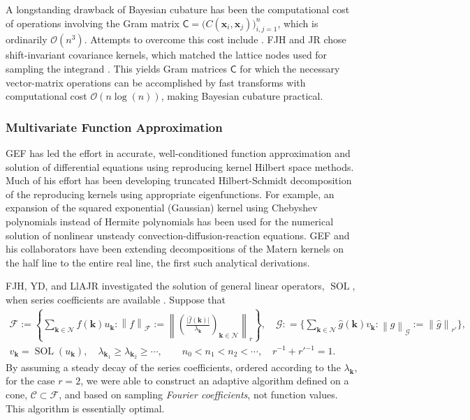 \documentclass[11pt]{NSFamsart}
\newcommand{\hf}{\widehat{f}}
\newcommand{\hg}{\widehat{g}}
\newcommand{\mC}{\mathsf{C}}
\DeclareMathOperator{\SOL}{SOL}
\newcommand{\bx}{{\boldsymbol{x}}}
\newcommand{\bk}{{\boldsymbol{k}}}
\newcommand{\cc}{\mathcal{C}}
\newcommand{\calf}{{\mathcal{F}}}
\newcommand{\calg}{{\mathcal{G}}}
\newcommand{\caln}{{\mathcal{N}}}
\newcommand{\bigabs}[1]{\ensuremath{\bigl \lvert #1 \bigr \rvert}}
\newcommand{\norm}[2][{}]{\ensuremath{\left \lVert #2 \right \rVert}_{#1}}
\newcommand{\bignorm}[2][{}]{\ensuremath{\bigl \lVert #2 \bigr \rVert}_{#1}}
\newcommand{\Order}{\mathcal{O}}
\begin{document}
A longstanding drawback of Bayesian cubature has been the computational cost of operations
involving the Gram matrix $\mC = \bigl(C(\bx_i,\bx_j)\bigr)_{i,j=1}^n$, which is ordinarily
$\Order(n^3)$.  Attempts to overcome this cost include \cite{AniCheSte16a, ParEtal17a}.  FJH and JR chose shift-invariant covariance kernels, which matched the lattice nodes used for sampling the integrand \cite{RatHic19a}. This yields Gram matrices $\mC$ for which the necessary vector-matrix operations can be accomplished by fast transforms with computational cost $\Order(n 
\log(n))$, making Bayesian cubature practical.  %

\subsubsection{Multivariate Function Approximation} \label{sec:PrevFunAppx}

GEF has led the effort in accurate, well-conditioned function approximation and solution of 
differential equations using reproducing kernel Hilbert space methods.  Much of his effort has been 
developing truncated Hilbert-Schmidt decomposition of the reproducing kernels using appropriate 
eigenfunctions.  For example, an expansion of the squared exponential (Gaussian) kernel using 
Chebyshev polynomials instead of Hermite polynomials has been used for the numerical solution of 
nonlinear unsteady 
convection-diffusion-reaction equations.  GEF and his collaborators have been extending 
decompositions of the Matern kernels on the half line to the entire real line, the first such analytical 
derivations.

FJH, YD, and LlAJR investigated the solution of general linear operators, $\SOL$, when series coefficients are available \cite{DinHic20a}.  Suppose that 
\begin{subequations} \label{serForm}
\begin{gather}
    \calf := \left \{ \sum_{\bk \in \caln} \hf(\bk) u_{\bk} : \norm[\calf]{f} := \norm[r]{\left(\frac{\bigabs{\hf(\bk)}}{\lambda_{\bk}} \right)_{\bk \in \caln}} \right \},  \quad
    \calg : = \biggl \{ \sum_{\bk \in \caln} \hg(\bk) v_{\bk} : \norm[\calg]{g} := \bignorm[r']{\hg}\biggr \}, \\ 
    v_{\bk} = \SOL(u_{\bk}), \quad
     \lambda_{\bk_1} \ge \lambda_{\bk_2} \ge \cdots, \qquad
      n_0 < n_1 < n_2 < \cdots, \quad r^{-1} + r'{}^{-1} = 1.
\end{gather}

\end{subequations}
By assuming a steady decay of the series coefficients, ordered according to the $\lambda_{\bk}$, for the case $r=2$, we were able to construct an adaptive algorithm defined on a cone, $\cc \subset \calf$, and based on sampling \emph{Fourier coefficients}, not function values.  This algorithm is essentially optimal.
\end{document}
